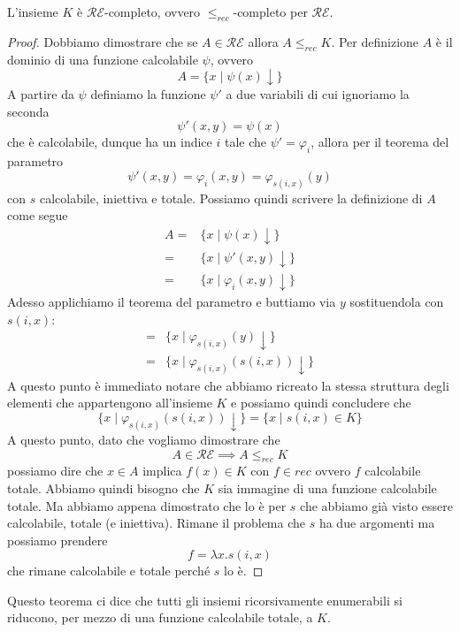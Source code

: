 \begin{theorem}
	L'insieme $K$ è $\mathcal{RE}$-completo, ovvero
	$\leq_{rec}$-completo per $\mathcal{RE}$.
	\begin{proof}
		Dobbiamo dimostrare che se $A \in \mathcal{RE}$ allora
		$A \leq_{rec} K$. Per definizione $A$ è il dominio di
		una funzione calcolabile $\psi$, ovvero
		\[ A = \{ x \mid \psi (x) \downarrow \} \]
		A partire da $\psi$ definiamo la funzione $\psi'$ a due
		variabili di cui ignoriamo la seconda
		\[ \psi' (x, y) = \psi(x) \]
		che è calcolabile, dunque ha un indice $i$ tale che
		$\psi' = \varphi_i$, allora per il teorema del parametro
		\[ \psi' (x, y) = \varphi_i(x, y) = \varphi_{s(i, x)} (y) \]
		con $s$ calcolabile, iniettiva e totale. Possiamo quindi
		scrivere la definizione di $A$ come segue
		\begin{align*}
			A = & \{ x \mid \psi(x) \downarrow \}         \\
			=   & \{ x \mid \psi'(x, y) \downarrow \}     \\
			=   & \{ x \mid \varphi_i(x, y) \downarrow \}
		\end{align*}
		Adesso applichiamo il teorema del parametro e buttiamo
		via $y$ sostituendola con $s(i, x)$:
		\begin{align*}
			= & \{ x \mid \varphi_{s(i, x)}(y) \downarrow \}       \\
			= & \{ x \mid \varphi_{s(i, x)}(s(i, x)) \downarrow \}
		\end{align*}
		A questo punto è immediato notare che abbiamo ricreato
		la stessa struttura degli elementi che appartengono
		all'insieme $K$ e possiamo quindi concludere che
		\[
			\{ x \mid \varphi_{s(i, x)}(s(i, x)) \downarrow \}
			= \{ x \mid s(i, x) \in K \}
		\]
		A questo punto, dato che vogliamo dimostrare che
		\[ A \in \mathcal{RE} \implies A \leq_{rec} K \]
		possiamo dire che $x \in A$ implica $f(x) \in K$ con
		$f \in rec$ ovvero $f$ calcolabile totale. Abbiamo quindi
		bisogno che $K$ sia immagine di una funzione calcolabile
		totale. Ma abbiamo appena dimostrato che lo è per $s$
		che abbiamo già visto essere calcolabile, totale (e
		iniettiva). Rimane il problema che $s$ ha due argomenti
		ma possiamo prendere 
		\[ f = \lambda x . s(i, x) \]
		che rimane calcolabile e totale perché $s$ lo è.
	\end{proof}
\end{theorem}

Questo teorema ci dice che tutti gli insiemi ricorsivamente
enumerabili si riducono, per mezzo di una funzione calcolabile
totale, a $K$.

